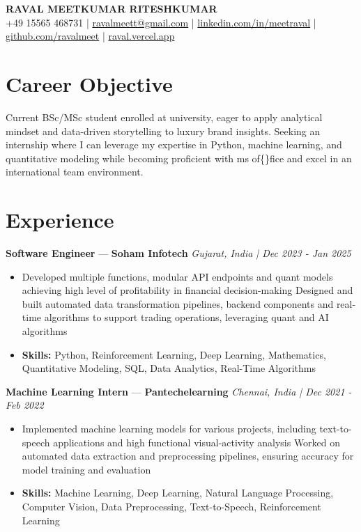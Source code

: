 \documentclass[a4paper,10pt]{article}
\begin{document}
\begin{center}
  {\Large\bfseries RAVAL MEETKUMAR RITESHKUMAR}\\[2pt]
  {\small +49 15565 468731 \;|\; \href{mailto:ravalmeett@gmail.com}{ravalmeett@gmail.com} \;|\; \href{https://www.linkedin.com/in/meetraval/}{linkedin.com/in/meetraval} \;|\; \href{https://github.com/ravalmeet}{github.com/ravalmeet} \;|\; \href{https://raval.vercel.app/}{raval.vercel.app}}
\end{center}
\vspace{-3pt}

\section*{Career Objective}
Current BSc/MSc student enrolled at university, eager to apply analytical mindset and data-driven storytelling to luxury brand insights. Seeking an internship where I can leverage my expertise in Python, machine learning, and quantitative modeling while becoming proficient with ms of\{\}fice and excel in an international team environment.\par

\section*{Experience}
\textbf{Software Engineer} — \textbf{Soham Infotech} \hfill \textit{Gujarat, India \;|\; Dec 2023 - Jan 2025}\par
\vspace{1pt}
\begin{itemize}
  \item Developed multiple functions, modular API endpoints and quant models achieving high level of profitability in financial decision-making Designed and built automated data transformation pipelines, backend components and real-time algorithms to support trading operations, leveraging quant and AI algorithms
  \item \textbf{Skills:} Python, Reinforcement Learning, Deep Learning, Mathematics, Quantitative Modeling, SQL, Data Analytics, Real-Time Algorithms
\end{itemize}
\vspace{3pt}
\textbf{Machine Learning Intern} — \textbf{Pantechelearning} \hfill \textit{Chennai, India \;|\; Dec 2021 - Feb 2022}\par
\vspace{1pt}
\begin{itemize}
  \item Implemented machine learning models for various projects, including text-to-speech applications and high functional visual-activity analysis Worked on automated data extraction and preprocessing pipelines, ensuring accuracy for model training and evaluation
  \item \textbf{Skills:} Machine Learning, Deep Learning, Natural Language Processing, Computer Vision, Data Preprocessing, Text-to-Speech, Reinforcement Learning
\end{itemize}
\end{document}
